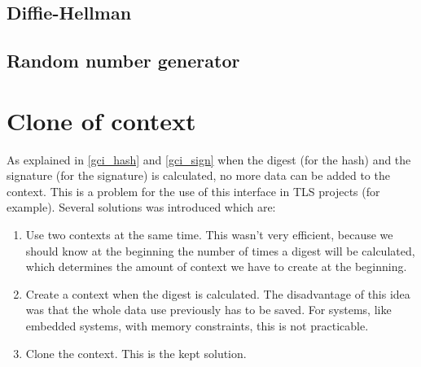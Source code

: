 \subsection{Diffie-Hellman}
\label{gci_dh}
\newpage
\subsection{Random number generator}
\label{gci_rng}
\newpage
\section{Clone of context}
\label{gci_cl_ctx}
As explained in \ref{gci_hash} and \ref{gci_sign} when the digest (for the hash)
and the signature (for the signature) is calculated, no more data can be added
to the context.\newline
This is a problem for the use of this interface in TLS projects (\embtls for
example).\newline
Several solutions was introduced which are:
\begin{enumerate}
  \item Use two contexts at the same time.\newline
  This wasn't very efficient, because we should know at the beginning the
  number of times a digest will be calculated, which determines the amount of
  context we have to create at the beginning.
  \item Create a context when the digest is calculated.\newline
  The disadvantage of this idea was that the whole data use previously has to be
  saved. For systems, like embedded systems, with memory constraints, this is
  not practicable.
  \item Clone the context. This is the kept solution.\newline
\end{enumerate}
